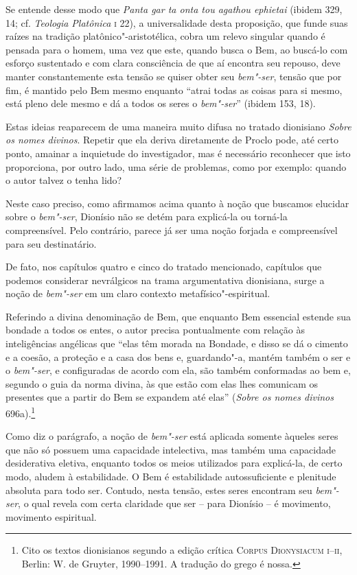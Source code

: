 Se entende desse modo que \textit{Panta gar ta onta tou agathou ephietai} 
(ibidem 329, 14; cf. \textit{Teologia Platônica} \textsc{i} 22), a universalidade desta
proposição, que funde suas raízes na tradição platônico"-aristotélica, cobra um
relevo singular quando é pensada para o homem, uma vez que este, quando busca o
Bem, ao buscá-lo com esforço sustentado e com clara consciência de que aí
encontra seu repouso, deve manter constantemente esta tensão se quiser obter seu 
\textit{bem"-ser}, tensão que por fim, é mantido pelo Bem mesmo enquanto ``atrai
todas as coisas para si mesmo, está pleno dele mesmo e dá a todos os seres o
\textit{bem"-ser}'' (ibidem 153, 18).

Estas ideias reaparecem de uma maneira muito difusa no tratado dionisiano
\textit{Sobre os nomes divinos}. Repetir que ela deriva diretamente de Proclo
pode, até certo ponto, amainar a inquietude do investigador, mas é necessário
reconhecer que isto proporciona, por outro lado, uma série de problemas, como
por exemplo: quando o autor talvez o tenha lido? 

Neste caso preciso, como afirmamos acima  quanto à noção que buscamos elucidar
sobre o \textit{bem"-ser}, Dionísio não se detém para explicá-la ou torná-la 
compreensível. Pelo contrário, parece já ser uma noção forjada e compreensível
para seu destinatário.

De fato, nos capítulos quatro e cinco do tratado mencionado, capítulos que
podemos considerar nevrálgicos na trama argumentativa dionisiana, surge a noção
de \textit{bem"-ser} em um claro contexto metafísico"-espiritual. 

Referindo a divina denominação de Bem, que enquanto Bem essencial estende sua
bondade a todos os entes, o autor precisa pontualmente com relação às
inteligências angélicas que ``elas têm morada na Bondade, e disso se dá o
cimento e a coesão, a proteção e a casa dos bens e, guardando"-a, mantém também o ser e o \textit{bem"-ser},
e configuradas de acordo com ela, são também conformadas ao bem e, segundo o
guia da norma divina, às que estão com elas lhes comunicam os presentes que a
partir do Bem se expandem até elas'' (\textit{Sobre os nomes divinos}
696a).\footnote{ 
  Cito os textos dionisianos segundo a edição crítica \textsc{Corpus
  Dionysiacum} \textsc{i--ii}, Berlin: W. de Gruyter, 1990--1991. A tradução do
  grego é nossa.}

Como diz o parágrafo, a noção de \textit{bem"-ser} está aplicada somente àqueles
seres que não só possuem uma capacidade intelectiva, mas também uma capacidade
desiderativa eletiva, enquanto todos os meios utilizados para explicá-la, de
certo modo, aludem à estabilidade. O Bem é estabilidade autossuficiente e
plenitude absoluta para todo ser. Contudo, nesta tensão, estes seres encontram
seu \textit{bem"-ser}, o qual revela com certa claridade que ser -- para Dionísio
-- é movimento, movimento espiritual. 

